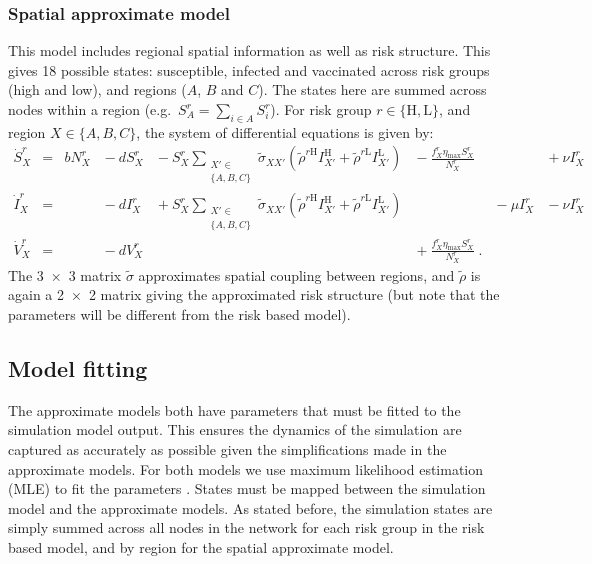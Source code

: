 \subsubsection*{Spatial approximate model}

This model includes regional spatial information as well as risk structure. This gives 18 possible states: susceptible, infected and vaccinated across risk groups (high and low), and regions ($A$, $B$ and $C$). The states here are summed across nodes within a region (e.g.\ $S^r_A = \sum_{i\in{}A}S^r_i$). For risk group $r\in{}\{\mathrm{H,L}\}$, and region $X\in{}\{A,B,C\}$, the system of differential equations is given by:
\begin{subequations}
    \begin{alignat}{7}
        \dot{S}^r_X &={} &bN^r_X &{}-{} dS^r_X &{}-{} S^r_X\sum_{\substack{X'\in\\\{A,B,C\}}}\tilde{\sigma}_{XX'}\left(\tilde{\rho}^{r\mathrm{H}}I^{\mathrm{H}}_{X'} + \tilde{\rho}^{r\mathrm{L}}I^{\mathrm{L}}_{X'}\right) &{}-{} \frac{f^r_X\eta{}_\mathrm{max}S^r_X}{N^r_X} &&{}+{} \nu{}I^r_X \\
        \dot{I}^r_X &={}  &&{}-{} dI^r_X &{}+{} S^r_X\sum_{\substack{X'\in\\\{A,B,C\}}}\tilde{\sigma}_{XX'}\left(\tilde{\rho}^{r\mathrm{H}}I^{\mathrm{H}}_{X'} + \tilde{\rho}^{r\mathrm{L}}I^{\mathrm{L}}_{X'}\right)& &{}-{} \mu{}I^r_X &{}-{} \nu{}I^r_X \\
        \dot{V}^r_X &={}  &&{}-{} dV^r_X &&{}+{} \frac{f^r_X\eta{}_\mathrm{max}S^r_X}{N^r_X}\;.
    \end{alignat}
    \label{eq:space_model}
\end{subequations}
The \num{3x3} matrix $\tilde{\sigma}$ approximates spatial coupling between regions, and $\tilde{\rho}$ is again a \num{2x2} matrix giving the approximated risk structure (but note that the parameters will be different from the risk based model).

\subsection{Model fitting\label{sec:ch4:model_fitting}}

The approximate models both have parameters that must be fitted to the simulation model output. This ensures the dynamics of the simulation are captured as accurately as possible given the simplifications made in the approximate models. For both models we use maximum likelihood estimation (MLE) to fit the parameters \citep{aldrich_ra_1997}. States must be mapped between the simulation model and the approximate models. As stated before, the simulation states are simply summed across all nodes in the network for each risk group in the risk based model, and by region for the spatial approximate model.

